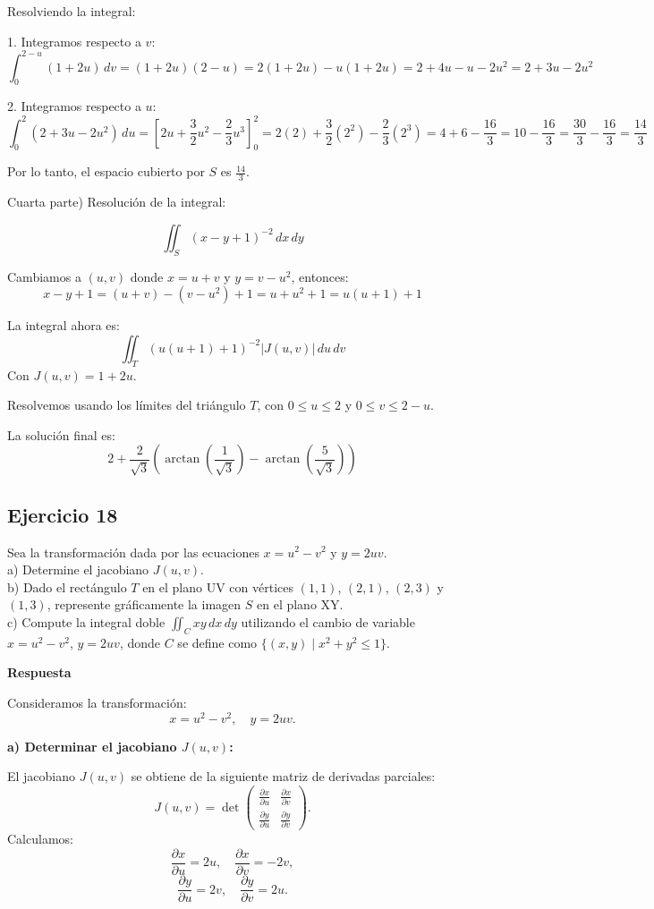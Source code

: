 \documentclass{report}
\begin{document}
Resolviendo la integral:

1. Integramos respecto a $v$:
$$
\int_0^{2-u} (1 + 2u) \, dv = (1 + 2u)(2 - u)
= 2(1 + 2u) - u(1 + 2u)
= 2 + 4u - u - 2u^2 = 2 + 3u - 2u^2
$$

2. Integramos respecto a $u$:
$$
\int_0^2 (2 + 3u - 2u^2) \, du
= \left[ 2u + \frac{3}{2}u^2 - \frac{2}{3}u^3 \right]_0^2
= 2(2) + \frac{3}{2}(2^2) - \frac{2}{3}(2^3)
= 4 + 6 - \frac{16}{3}
= 10 - \frac{16}{3}
= \frac{30}{3} - \frac{16}{3} = \frac{14}{3}
$$

Por lo tanto, el espacio cubierto por $S$ es $\frac{14}{3}$.

Cuarta parte) Resolución de la integral:

$$
\iint_S (x - y + 1)^{-2} \, dx \, dy
$$

Cambiamos a $(u, v)$ donde $x = u + v$ y $y = v - u^2$, entonces:
$$
x - y + 1 = (u + v) - (v - u^2) + 1 = u + u^2 + 1 = u(u + 1) + 1
$$

La integral ahora es:
$$
\iint_T \left( u(u + 1) + 1 \right)^{-2} |J(u, v)| \, du \, dv
$$
Con $J(u, v) = 1 + 2u$.

Resolvemos usando los límites del triángulo $T$, con $0 \leq u \leq 2$ y $0 \leq v \leq 2 - u$.

La solución final es:
$$
2 + \frac{2}{\sqrt{3}} \left( \arctan\left(\frac{1}{\sqrt{3}}\right) - \arctan\left(\frac{5}{\sqrt{3}}\right) \right)
$$\subsection{Ejercicio 18}
Sea la transformación dada por las ecuaciones $x=u^{2}-v^{2}$ y $y=2uv$.\\
a) Determine el jacobiano $J(u, v)$.\\
b) Dado el rectángulo $T$ en el plano UV con vértices $(1,1)$, $(2,1)$, $(2,3)$ y $(1,3)$, represente gráficamente la imagen $S$ en el plano XY.\\
c) Compute la integral doble $\iint_{C} x y \, dx \, dy$ utilizando el cambio de variable $x=u^{2}-v^{2}$, $y=2uv$, donde $C$ se define como $\{(x, y) \mid x^{2}+y^{2} \leq 1\}$.

\textbf{Respuesta}

Consideramos la transformación:
\[
x = u^{2} - v^{2}, \quad y = 2uv.
\]

\textbf{a) Determinar el jacobiano $J(u, v)$:}

El jacobiano $J(u,v)$ se obtiene de la siguiente matriz de derivadas parciales:
\[
J(u,v) = \det\begin{pmatrix} 
\frac{\partial x}{\partial u} & \frac{\partial x}{\partial v} \\
\frac{\partial y}{\partial u} & \frac{\partial y}{\partial v}
\end{pmatrix}.
\]
Calculamos:
\[
\frac{\partial x}{\partial u} = 2u, \quad \frac{\partial x}{\partial v} = -2v,
\]
\[
\frac{\partial y}{\partial u} = 2v, \quad \frac{\partial y}{\partial v} = 2u.
\]
\end{document}
